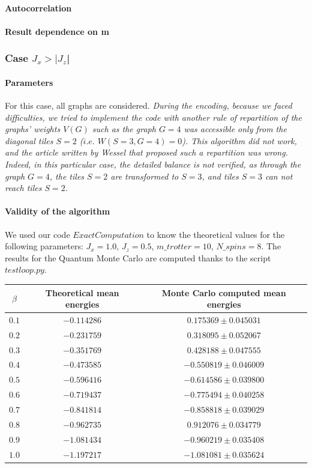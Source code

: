 \documentclass[a4paper,12pt,twoside]{article}
\begin{document}
	\paragraph{Autocorrelation}
	
	\paragraph{Result dependence on m}
	
	\subsubsection{Case $J_{x} > |J_{z}$|}
	
	\paragraph{Parameters} For this case, all graphs are considered.
	\emph{During the encoding, because we faced difficulties, we tried to implement the code with another rule of repartition of the graphs' weights $V(G)$ such as the graph $G = 4$ was accessible only from the diagonal tiles $S = 2$ ($i.e.$ $W(S=3, G=4)=0$). This algorithm did not work, and the article written by Wessel that proposed such a repartition was wrong. Indeed, in this particular case, the detailed balance is not verified, as through the graph $G=4$, the tiles $S=2$ are transformed to $S=3$, and tiles $S=3$ can not reach tiles $S=2$.}
	
	\paragraph{Validity of the algorithm} We used our code $ExactComputation$ to know the theoretical values for the following parameters: $J_x = 1.0$, $J_z = 0.5$,  $m\_trotter = 10$,  $N\_spins = 8$. The results for the Quantum Monte Carlo are computed thanks to the script $testloop.py$. \\
	\begin{tabular}[c]{| c || c | c |}
		\hline            
		$\beta$ & Theoretical mean energies & Monte Carlo computed mean energies \\ \hline
		$0.1$ & $-0.114286$ & $0.175369 \pm 0.045031$ \\ \hline
		$0.2$ & $-0.231759$ & $0.318095 \pm 0.052067$ \\ \hline
		$0.3$ & $-0.351769$ & $0.428188 \pm 0.047555$ \\ \hline
		$0.4$ & $-0.473585$ & $-0.550819 \pm 0.046009$ \\ \hline
		$0.5$ & $-0.596416$ & $-0.614586 \pm 0.039800$ \\ \hline
		$0.6$ & $-0.719437$ & $-0.775494 \pm 0.040258$ \\ \hline
		$0.7$ & $-0.841814$ & $-0.858818 \pm 0.039029$ \\ \hline
		$0.8$ & $-0.962735$ & $0.912076 \pm 0.034779$ \\ \hline
		$0.9$ & $-1.081434$ & $-0.960219 \pm 0.035408$ \\ \hline
		$1.0$ & $-1.197217$ & $-1.081081 \pm 0.035624$ \\ \hline
	\end{tabular} 
	\newline
\end{document}
